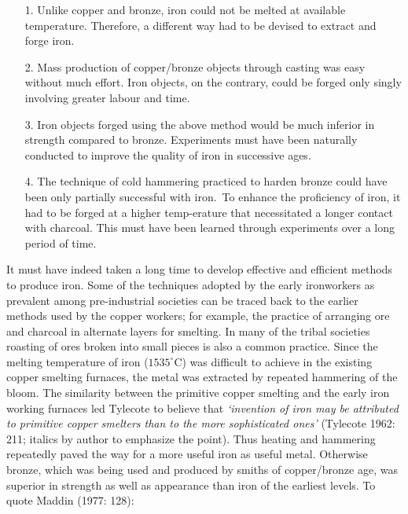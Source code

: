 \begin{itemize}
\item[1.] Unlike copper and bronze, iron could not be melted at available temperature. Therefore, a different way had to be devised to extract and forge iron.

\vspace{-.2cm}

\item[2.] Mass production of copper/bronze objects through casting was easy without much effort. Iron objects, on the contrary, could be forged only singly involving greater labour and time.

\newpage
\item[3.] Iron objects forged using the above method would be much inferior in strength compared to bronze. Experiments must have been naturally conducted to improve the quality of iron in successive ages.

\vspace{-.2cm}

\item[4.] The technique of cold hammering practiced to harden bronze could have been only partially successful with iron.~To enhance the proficiency of iron, it had to be forged at a higher temp-\break erature that necessitated a longer contact with charcoal. This must have been learned through experiments over a long period of time. 
\end{itemize}

\vspace{-.2cm}

It must have indeed taken a long time to develop effective and efficient methods to produce iron. Some of the techniques adopted by the early ironworkers as prevalent among pre-industrial societies can be traced back to the earlier methods used by the copper workers; for example, the practice of arranging ore and charcoal in alternate layers for smelting. In many of the tribal societies roasting of ores broken into small pieces is also a common practice. Since the melting temperature of iron ($1535^{\circ}$C) was difficult to achieve in the existing copper smelting furnaces, the metal was extracted by repeated hammering of the bloom. The similarity between the primitive copper smelting and the early iron working furnaces led Tylecote to believe that \textit{`invention of iron may be attributed to primitive copper smelters than to the more sophisticated ones'} (Tylecote 1962: 211; italics by author to emphasize the point). Thus heating and hammering repeatedly paved the way for a more useful iron as useful metal. Otherwise bronze, which was being used and produced by smiths of copper/bronze age, was superior in strength as well as appearance than iron of the earliest levels. To quote Maddin (1977: 128): 

